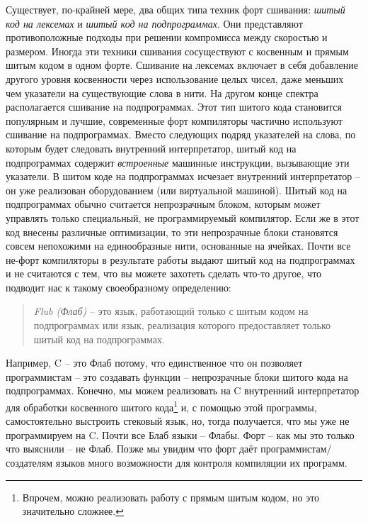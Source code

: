 Существует, по-крайней мере, два общих типа техник форт сшивания: \emph{шитый код на лексемах} и \emph{шитый код на подпрограммах}. Они представляют противоположные подходы при решении компромисса между скоростью и размером. Иногда эти техники сшивания сосуществуют с косвенным и прямым шитым кодом в одном форте. Сшивание на лексемах включает в себя добавление другого уровня косвенности через использование целых чисел, даже меньших чем указатели на существующие слова в нити. На другом конце спектра располагается сшивание на подпрограммах. Этот тип шитого кода становится популярным и лучшие, современные форт компиляторы частично используют сшивание на подпрограммах. Вместо следующих подряд указателей на слова, по которым будет следовать внутренний интерпретатор, шитый код на подпрограммах содержит \emph{встроенные} машинные инструкции, вызывающие эти указатели. В шитом коде на подпрограммах исчезает внутренний интерпретатор -- он уже реализован оборудованием (или виртуальной машиной). Шитый код на подпрограммах обычно считается непрозрачным блоком, которым может управлять только специальный, не программируемый компилятор. Если же в этот код внесены различные оптимизации, то эти непрозрачные блоки становятся совсем непохожими на единообразные нити, основанные на ячейках. Почти все не-форт компиляторы в результате работы выдают шитый код на подпрограммах и не считаются с тем, что вы можете захотеть сделать что-то другое, что подводит нас к такому своеобразному определению:

\begin{quote}
\emph{Flub (Флаб)} -- это язык, работающий только с шитым кодом на подпрограммах или язык, реализация которого предоставляет только шитый код на подпрограммах.
\end{quote}

Например, C -- это Флаб потому, что единственное что он позволяет программистам -- это создавать функции -- непрозрачные блоки шитого кода на подпрограммах. Конечно, мы можем реализовать на C внутренний интерпретатор для обработки косвенного шитого кода\footnote{Впрочем, можно реализовать работу с прямым шитым кодом, но это значительно сложнее.} и, с помощью этой программы, самостоятельно выстроить стековый язык, но, тогда получается, что мы уже не программируем на C. Почти все Блаб языки -- Флабы. Форт -- как мы это только что выяснили -- не Флаб. Позже мы увидим что форт даёт программистам/создателям языков много возможности для контроля компиляции их программ.

